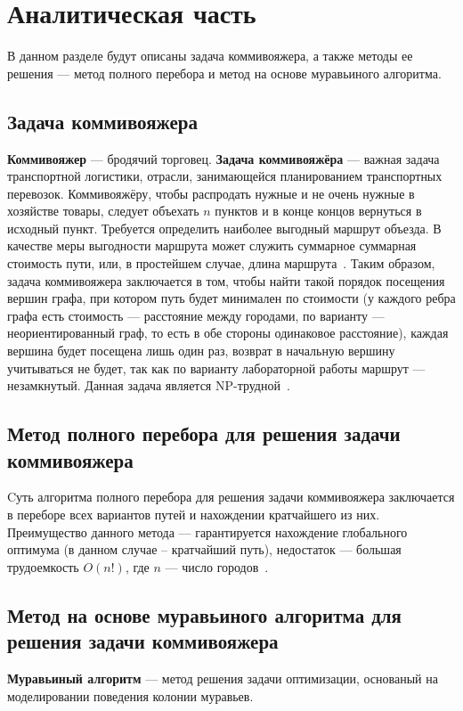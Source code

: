 \chapter{Аналитическая часть}
В данном разделе будут описаны задача коммивояжера, а также методы ее решения --- метод полного перебора и метод на основе муравьиного алгоритма.

\section{Задача коммивояжера}
\textbf{Коммивояжер} --- бродячий торговец. \textbf{Задача коммивояжёра} --- важная задача транспортной логистики, отрасли, занимающейся планированием транспортных перевозок. Коммивояжёру, чтобы распродать нужные и не очень нужные в хозяйстве товары, следует объехать $n$ пунктов и в конце концов вернуться в исходный пункт. Требуется определить наиболее выгодный маршрут объезда. В качестве меры выгодности маршрута может служить суммарное суммарная стоимость пути, или, в простейшем случае, длина маршрута~\cite{voyage_task}. Таким образом, задача коммивояжера заключается в том, чтобы найти такой порядок посещения вершин графа, при котором путь будет минимален по стоимости (у каждого ребра графа есть стоимость --- расстояние между городами, по варианту --- неориентированный граф, то есть в обе стороны одинаковое расстояние), каждая вершина будет посещена лишь один раз, возврат в начальную вершину учитываться не будет, так как по варианту лабораторной работы маршрут --- незамкнутый. Данная задача является NP-трудной~\cite{np}.

\section{Метод полного перебора для решения задачи коммивояжера}
Cуть алгоритма полного перебора для решения задачи коммивояжера заключается в переборе всех вариантов путей и нахождении кратчайшего из них. Преимущество данного метода --- гарантируется нахождение глобального оптимума (в данном случае -- кратчайший путь), недостаток --- большая трудоемкость $O(n!)$, где $n$ --- число городов~\cite{perebor}.

\section{Метод на основе муравьиного алгоритма для решения задачи коммивояжера}
\textbf{Муравьиный алгоритм} \cite{ant} --- метод решения задачи оптимизации, основаный на моделировании поведения колонии муравьев.

